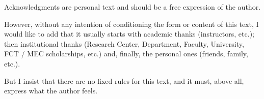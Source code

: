 
%

\begin{ntacknowledgements}

  Acknowledgments are personal text and should be a free expression of the author.

  However, without any intention of conditioning the form or content of this text, I would
  like to add that it usually starts with academic thanks (instructors, etc.); then institutional
  thanks (Research Center, Department, Faculty, University, FCT / MEC scholarships, etc.) and,
  finally, the personal ones (friends, family, etc.).

  But I insist that there are no fixed rules for this text, and it must, above all, express
  what the author feels.

\end{ntacknowledgements}